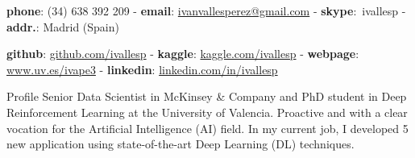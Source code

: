 \documentclass{resume} %
\begin{document}
  

\vspace{-23pt}

\begin{Center}
        {\textbf{phone}: (34) 638 392 209 - 
        \textbf{email}: \href{mailto:ivanvallesperez@gmail.com}{ivanvallesperez@gmail.com} -
         \textbf{skype}:\ ivallesp -
         \textbf{addr.}: Madrid (Spain) }
\end{Center}

\vspace{-6pt}

\begin{Center}
        \textbf{github}: \href{https://www.github.com/ivallesp}{github.com/ivallesp}   -  \textbf{kaggle}: \href{https://www.kaggle.com/ivallesp}{kaggle.com/ivallesp}  -  \textbf{webpage}: \href{https://www.uv.es/~ivape3}{www.uv.es/ivape3} - 
        \textbf{linkedin}: 
        \href{https://www.linkedin.com/in/ivallesp}{linkedin.com/in/ivallesp}
\end{Center}

\vspace{-5pt}

  
      

\begin{rSection}{Profile}
Senior Data Scientist in McKinsey \& Company and PhD student in Deep Reinforcement Learning at the University of Valencia. Proactive and with a clear vocation for the Artificial Intelligence (AI) field. In my current job, I developed 5 new application using state-of-the-art Deep Learning (DL) techniques.
\end{rSection}


\end{document}
